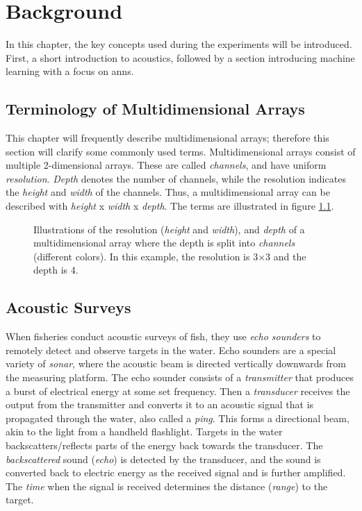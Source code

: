 \chapter{Background}
    In this chapter, the key concepts used during the experiments will be introduced. First, a short introduction to acoustics, followed by a section introducing machine learning with a focus on \gls{ann}s. 
    
\section{Terminology of Multidimensional Arrays}
    This chapter will frequently describe multidimensional arrays; therefore this section will clarify some commonly used terms. Multidimensional arrays consist of multiple 2-dimensional arrays. These are called \textit{channels}, and have uniform \textit{resolution}. \textit{Depth} denotes the number of channels, while the resolution indicates the \textit{height} and \textit{width} of the channels. Thus, a multidimensional array can be described with \textit{height} x \textit{width} x \textit{depth}. The terms are illustrated in figure \ref{Multidimensional array terminology}.
    
        \begin{figure}[H]
        \centering
                        
        \caption[Multidimensional  array]{Illustrations of the resolution (\textit{height} and \textit{width}), and \textit{depth} of a multidimensional array where the depth is split into \textit{channels} (different colors). In this example, the resolution is 3×3 and the depth is 4. }
      	\medskip 
        \label{Multidimensional array terminology}
    \end{figure}



\section{Acoustic Surveys}
    When fisheries conduct acoustic surveys of fish, they use \textit{echo sounders} to remotely detect and observe targets in the water. Echo sounders are a special variety of \textit{sonar}, where the acoustic beam is directed vertically downwards from the measuring platform. The echo sounder consists of a \textit{transmitter} that produces a burst of electrical energy at some set frequency. Then a \textit{transducer} receives the output from the transmitter and converts it to an acoustic signal that is propagated through the water, also called a \textit{ping}. This forms a directional beam, akin to the light from a handheld flashlight. Targets in the water backscatters/reflects parts of the energy back towards the transducer. The \textit{backscattered} sound (\textit{echo}) is detected by the transducer, and the sound is converted back to electric energy as the received signal and is further amplified. The \textit{time} when the signal is received determines the distance (\textit{range}) to the target\cite{simmonds2008fisheries}.
    
